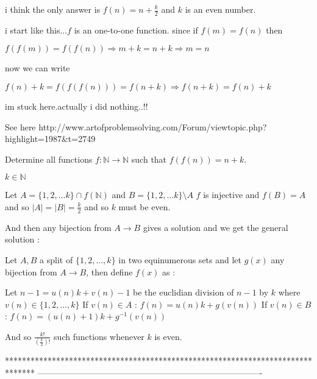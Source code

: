 \begin{solution}
	i think the only answer is  $f(n)=n+\frac{k}{2}$  and $k$ is an even number.

i start like this...$f$ is an one-to-one function. since if $f(m)=f(n)$ then 

                                                                                    $f(f(m))=f(f(n)) \Rightarrow m+k=n+k \Rightarrow m=n$

now we can write

                                                                    $f(n)+k=f(f(f(n)))=f(n+k) \Rightarrow f(n+k)=f(n)+k$

im stuck here.actually i did nothing..!!
\end{solution}



\begin{solution}
	See here
http://www.artofproblemsolving.com/Forum/viewtopic.php?highlight=1987&t=2749
\end{solution}



\begin{solution}
	\begin{tcolorbox}Determine all functions  $f : \mathbb{N} \rightarrow \mathbb{N} $ such that  $f(f(n))=n+k$.

$k \in  \mathbb{N}$\end{tcolorbox}
Let $A=\{1,2,...k\}\cap f(\mathbb N)$ and $B=\{1,2,...k\}\setminus A$
$f$ is injective and $f(B)=A$ and so $|A|=|B|=\frac k2$ and so $k$ must be even.

And then any bijection from $A\to B$ gives a solution and we get the general solution :

Let $A,B$ a split of $\{1,2,...,k\}$ in two equinumerous sets and let $g(x)$ any bijection from $A\to B$, then define $f(x)$ as :

Let $n-1=u(n)k+v(n)-1$ be the euclidian division of $n-1$ by $k$ where $v(n)\in\{1,2,...,k\}$
If $v(n)\in A$ : $f(n)=u(n)k+g(v(n))$
If $v(n)\in B$ : $f(n)=(u(n)+1)k+g^{-1}(v(n))$

And so $\frac{k!}{\left(\frac k2\right)!}$ such functions whenever $k$ is even.
\end{solution}
*******************************************************************************
-------------------------------------------------------------------------------

